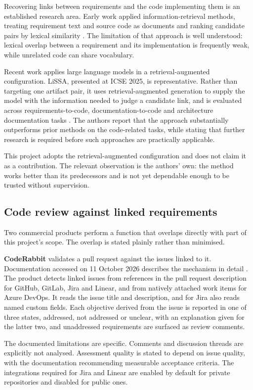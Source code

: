 Recovering links between requirements and the code implementing them is an
established research area. Early work applied information-retrieval methods,
treating requirement text and source code as documents and ranking candidate
pairs by lexical similarity \cite{delucia2007}. The limitation of that approach
is well understood: lexical overlap between a requirement and its implementation
is frequently weak, while unrelated code can share vocabulary.

Recent work applies large language models in a retrieval-augmented
configuration. LiSSA, presented at ICSE 2025, is representative. Rather than
targeting one artifact pair, it uses retrieval-augmented generation to supply
the model with the information needed to judge a candidate link, and is
evaluated across requirements-to-code, documentation-to-code and architecture
documentation tasks \cite{lissa2025}. The authors report that the approach
substantially outperforms prior methods on the code-related tasks, while stating
that further research is required before such approaches are practically
applicable.

This project adopts the retrieval-augmented configuration and does not claim it
as a contribution. The relevant observation is the authors' own: the method
works better than its predecessors and is not yet dependable enough to be
trusted without supervision.

\subsection{Code review against linked requirements}

Two commercial products perform a function that overlaps directly with part of
this project's scope. The overlap is stated plainly rather than minimised.

\textbf{CodeRabbit} validates a pull request against the issues linked to it.
Documentation accessed on 11 October 2026 describes the mechanism in detail
\cite{coderabbitdocs}. The product detects linked issues from references in the
pull request description for GitHub, GitLab, Jira and Linear, and from natively
attached work items for Azure DevOps. It reads the issue title and description,
and for Jira also reads named custom fields. Each objective derived from the
issue is reported in one of three states, addressed, not addressed or unclear,
with an explanation given for the latter two, and unaddressed requirements are
surfaced as review comments.

The documented limitations are specific. Comments and discussion threads are
explicitly not analysed. Assessment quality is stated to depend on issue
quality, with the documentation recommending measurable acceptance criteria.
The integrations required for Jira and Linear are enabled by default for private
repositories and disabled for public ones.

